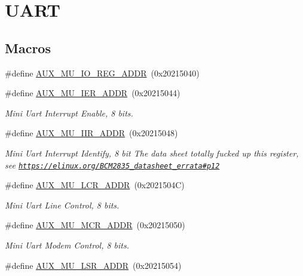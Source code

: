 \hypertarget{group__UART}{}\section{U\+A\+RT}
\label{group__UART}
\subsection*{Macros}
\begin{DoxyCompactItemize}
\item 
\#define \hyperlink{group__UART_gad430fbd4dcccfc37e6a75aac3ed1b407}{A\+U\+X\+\_\+\+M\+U\+\_\+\+I\+O\+\_\+\+R\+E\+G\+\_\+\+A\+D\+DR}~(0x20215040)
\item 
\#define \hyperlink{group__UART_gab7f0b281001eba1983b44e5bd3de3624}{A\+U\+X\+\_\+\+M\+U\+\_\+\+I\+E\+R\+\_\+\+A\+D\+DR}~(0x20215044)
\begin{DoxyCompactList}\small\item\em Mini Uart Interrupt Enable, 8 bits. \end{DoxyCompactList}\item 
\#define \hyperlink{group__UART_ga671559e30e80a6d003fcb46ac99d7723}{A\+U\+X\+\_\+\+M\+U\+\_\+\+I\+I\+R\+\_\+\+A\+D\+DR}~(0x20215048)
\begin{DoxyCompactList}\small\item\em Mini Uart Interrupt Identify, 8 bit The data sheet totally fucked up this register, see \href{https://elinux.org/BCM2835_datasheet_errata#p12}{\tt https\+://elinux.\+org/\+B\+C\+M2835\+\_\+datasheet\+\_\+errata\#p12} \end{DoxyCompactList}\item 
\#define \hyperlink{group__UART_gaaed9b3cea1302e02eb4ac7cf34e4e166}{A\+U\+X\+\_\+\+M\+U\+\_\+\+L\+C\+R\+\_\+\+A\+D\+DR}~(0x2021504\+C)
\begin{DoxyCompactList}\small\item\em Mini Uart Line Control, 8 bits. \end{DoxyCompactList}\item 
\#define \hyperlink{group__UART_ga76017c2dd6557c4d387828112f1335fe}{A\+U\+X\+\_\+\+M\+U\+\_\+\+M\+C\+R\+\_\+\+A\+D\+DR}~(0x20215050)
\begin{DoxyCompactList}\small\item\em Mini Uart Modem Control, 8 bits. \end{DoxyCompactList}\item 
\#define \hyperlink{group__UART_ga118983fa3b92ba87e7d341722fa0bc31}{A\+U\+X\+\_\+\+M\+U\+\_\+\+L\+S\+R\+\_\+\+A\+D\+DR}~(0x20215054)

\end{DoxyCompactItemize}
